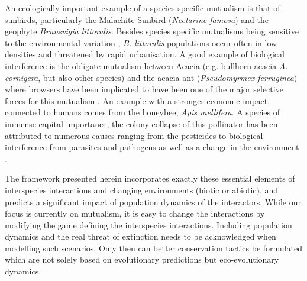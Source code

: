 \documentclass[12pt]{article}
\begin{document}
An ecologically important example of a species specific mutualism is that of sunbirds, particularly the Malachite Sunbird (\textit{Nectarine famosa}) and the geophyte \textit{Brunsvigia littoralis}. Besides species specific mutualisms being sensitive to the environmental variation \citep{aizen:Science:2012}, \textit{B. littoralis} populations occur often in low densities \citep{geerts:SAJB:2012} and threatened by rapid urbanisation. A good example of biological interference is the obligate mutualism between Acacia (e.g. bullhorn acacia \textit{A. cornigera}, but also other species) and the acacia ant (\textit{Pseudomyrmex ferruginea}) where browsers have been implicated to have been one of the major selective forces for this mutualism \citep{brown:Ecology:1960,janzen:Evolution:1966}. 
An example with a stronger economic impact, connected to humans comes from the honeybee, \textit{Apis mellifera}. 
A species of immense capital importance, the colony collapse of this pollinator has been attributed to numerous causes ranging from the pesticides to biological interference from parasites and pathogens as well as a change in the environment \citep{nazzi:PLosPath:2012}.

The framework presented herein incorporates exactly these essential elements of interspecies interactions and changing environments (biotic or abiotic), and predicts a significant impact of population dynamics of the interactors. While our focus is currently on mutualism, it is easy to change the interactions by modifying the game defining the interspecies interactions. Including population dynamics and the real threat of extinction needs to be acknowledged when modelling such scenarios. Only then can better conservation tactics be formulated which are not solely based on evolutionary predictions but eco-evolutionary dynamics.
\end{document}
